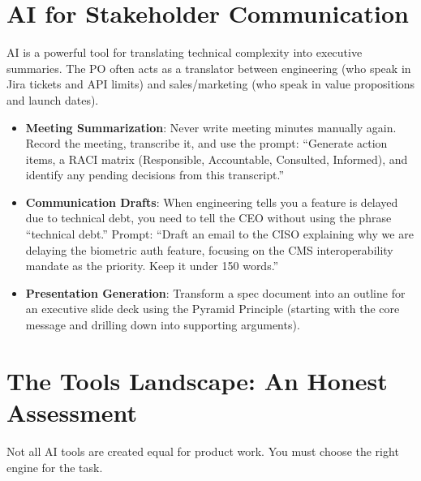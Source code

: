 \documentclass[
  11pt,
  openany,
  oneside]{book}
\providecommand{\tightlist}{%
  \setlength{\itemsep}{0pt}\setlength{\parskip}{0pt}}
\begin{document}
\section{AI for Stakeholder
Communication}\label{ai-for-stakeholder-communication}

AI is a powerful tool for translating technical complexity into
executive summaries. The PO often acts as a translator between
engineering (who speak in Jira tickets and API limits) and
sales/marketing (who speak in value propositions and launch dates).

\begin{itemize}
\tightlist
\item
  \textbf{Meeting Summarization}: Never write meeting minutes manually
  again. Record the meeting, transcribe it, and use the prompt:
  ``Generate action items, a RACI matrix (Responsible, Accountable,
  Consulted, Informed), and identify any pending decisions from this
  transcript.''
\item
  \textbf{Communication Drafts}: When engineering tells you a feature is
  delayed due to technical debt, you need to tell the CEO without using
  the phrase ``technical debt.'' Prompt: ``Draft an email to the CISO
  explaining why we are delaying the biometric auth feature, focusing on
  the CMS interoperability mandate as the priority. Keep it under 150
  words.''
\item
  \textbf{Presentation Generation}: Transform a spec document into an
  outline for an executive slide deck using the Pyramid Principle
  (starting with the core message and drilling down into supporting
  arguments).
\end{itemize}

\section{The Tools Landscape: An Honest
Assessment}\label{the-tools-landscape-an-honest-assessment}

Not all AI tools are created equal for product work. You must choose the
right engine for the task.
\end{document}
